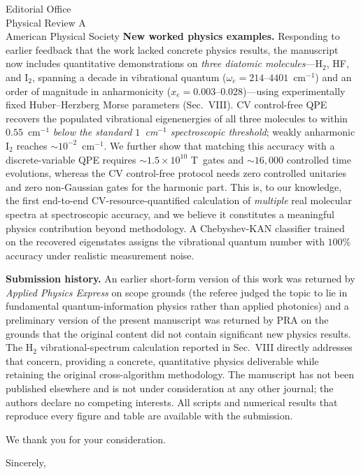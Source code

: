 \documentclass[11pt]{letter}
\begin{document}
\begin{letter}{Editorial Office \\ Physical Review A \\ American Physical
Society}
\textbf{New worked physics examples.} Responding to earlier feedback that
the work lacked concrete physics results, the manuscript now includes
quantitative demonstrations on \emph{three diatomic molecules}---H$_2$,
HF, and I$_2$, spanning a decade in vibrational quantum
($\omega_e=214$--$4401$~cm$^{-1}$) and an order of magnitude in
anharmonicity ($x_e=0.003$--$0.028$)---using experimentally fixed
Huber--Herzberg Morse parameters (Sec.~VIII). CV control-free QPE
recovers the populated vibrational eigenenergies of all three molecules
to within $0.55$~cm$^{-1}$ \emph{below the standard $1$~cm$^{-1}$
spectroscopic threshold}; weakly anharmonic I$_2$ reaches
$\sim\!10^{-2}$~cm$^{-1}$. We further show that matching this accuracy
with a discrete-variable QPE requires $\sim 1.5\times10^{10}$ T~gates and
$\sim\!16{,}000$ controlled time evolutions, whereas the CV control-free
protocol needs zero controlled unitaries and zero non-Gaussian gates for
the harmonic part. This is, to our knowledge, the first end-to-end
CV-resource-quantified calculation of \emph{multiple} real molecular
spectra at spectroscopic accuracy, and we believe it constitutes a
meaningful physics contribution beyond methodology. A Chebyshev-KAN
classifier trained on the recovered eigenstates assigns the vibrational
quantum number with $100\%$ accuracy under realistic measurement noise.

\textbf{Submission history.} An earlier short-form version of this work
was returned by \emph{Applied Physics Express} on scope grounds (the
referee judged the topic to lie in fundamental quantum-information
physics rather than applied photonics) and a preliminary version of the
present manuscript was returned by PRA on the grounds that the original
content did not contain significant new physics results. The H$_2$
vibrational-spectrum calculation reported in Sec.~VIII directly
addresses that concern, providing a concrete, quantitative physics
deliverable while retaining the original cross-algorithm methodology. The manuscript has not been
published elsewhere and is not under consideration at any other journal;
the authors declare no competing interests. All scripts and numerical
results that reproduce every figure and table are available with the
submission.

We thank you for your consideration.

\closing{Sincerely,}

\end{letter}
\end{document}
